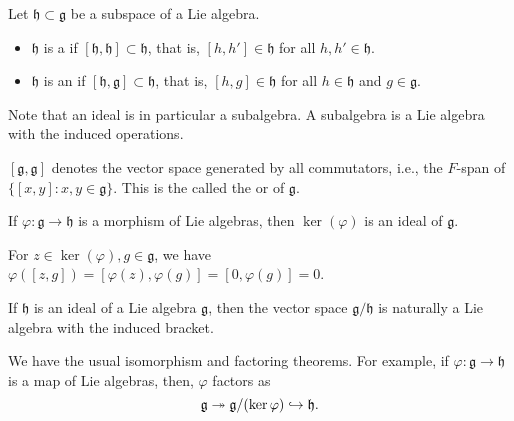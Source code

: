 \documentclass[12pt]{article}
\begin{document}
\begin{defn}
	Let $\mathfrak{h} \subset \mathfrak{g}$ be a subspace of a Lie algebra.
	\begin{itemize}
		\item $\mathfrak{h}$ is a  if $[\mathfrak{h}, \mathfrak{h}] \subset \mathfrak{h}$, that is, $[h, h'] \in \mathfrak{h}$ for all $h, h' \in \mathfrak{h}$.
		\item $\mathfrak{h}$ is an  if $[\mathfrak{h}, \mathfrak{g}] \subset \mathfrak{h}$, that is, $[h, g] \in \mathfrak{h}$ for all $h \in \mathfrak{h}$ and $g \in \mathfrak{g}$.
	\end{itemize}
\end{defn}
Note that an ideal is in particular a subalgebra. 
A subalgebra is a Lie algebra with the induced operations.

\begin{defn}
	$[\mathfrak{g}, \mathfrak{g}]$ denotes the vector space generated by all commutators, i.e., the $F$-span of $\{[x, y] : x, y \in \mathfrak{g}\}$. \newline
	This is the called the  or  of $\mathfrak{g}$.
\end{defn}

\begin{thm}
	If $\varphi \colon \mathfrak{g} \to \mathfrak{h}$ is a morphism of Lie algebras, then $\ker(\varphi)$ is an ideal of $\mathfrak{g}$.
\end{thm}
\begin{sketch} 
	For $z \in \ker(\varphi), g \in \mathfrak{g}$, we have $\varphi([z, g]) = [\varphi(z), \varphi(g)] = [0, \varphi(g)] = 0$.
\end{sketch}

\begin{thm}
	If $\mathfrak{h}$ is an ideal of a Lie algebra $\mathfrak{g}$, then the vector space $\mathfrak{g}/\mathfrak{h}$ is naturally a Lie algebra with the induced bracket.
\end{thm}

\begin{rem}
	We have the usual isomorphism and factoring theorems. For example, if $\varphi : \mathfrak{g} \to \mathfrak{h}$ is a map of Lie algebras, then, $\varphi$ factors as
	\begin{equation*} 
		\mathfrak{g} \twoheadrightarrow \mathfrak{g}/(\ker \varphi) \hookrightarrow \mathfrak{h}.
	\end{equation*}
\end{rem}
\end{document}
